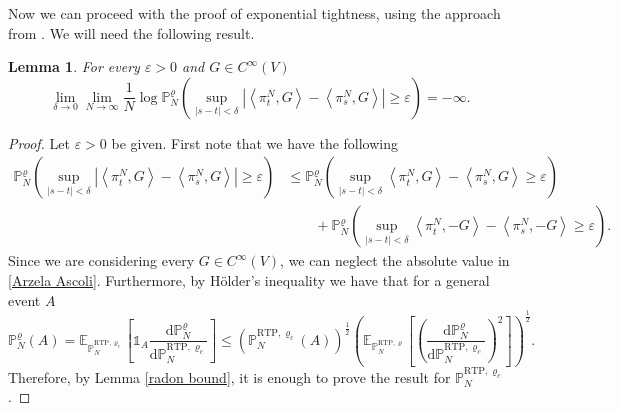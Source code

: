 \documentclass[11pt]{article}
\numberwithin{equation}{section}
\theoremstyle{definition}
\theoremstyle{plain}
\newtheorem{Lemma}[Theorem]{Lemma}
\newcommand{\E}{\mathbb{E}}
\newcommand{\p}{\mathbb{P}}
\newcommand{\dd}{\mathrm{d}}
\newcommand{\nn}{\nonumber}
\newcommand{\RTP}{\mathrm{RTP}}
\begin{document}
Now we can proceed with the proof of exponential tightness, using the approach from \cite{KipnisLandim}. We will need the following result.
    \begin{Lemma}\label{cont cond}
        For every $\varepsilon>0$ and $G \in C^\infty(V)$ 
            \begin{equation}\label{Arzela Ascoli}
                \lim_{\delta\to0} \lim_{N\to\infty} \frac{1}{N}\log \p^{\varrho}_N\left(\sup_{|s-t|<\delta} \left| \left<\pi^N_{t}, G\right> - \left<\pi^N_{s}, G\right> \right| \geq \varepsilon \right)= -\infty.
            \end{equation}
    \end{Lemma}
\begin{proof}
Let $\varepsilon>0$ be given. First note that we have the following 
    \begin{align}
        \p^{\varrho}_N\left(\sup_{|s-t|<\delta} \left| \left<\pi^N_{t}, G\right> - \left<\pi^N_{s}, G\right> \right| \geq \varepsilon \right)
        \nn&\leq \p^{\varrho}_N\left(\sup_{|s-t|<\delta}  \left<\pi^N_{t}, G\right> - \left<\pi^N_{s}, G\right>  \geq \varepsilon \right)\\
        &\qquad +\p^{\varrho}_N\left(\sup_{|s-t|<\delta}  \left<\pi^N_{t}, -G\right> - \left<\pi^N_{s}, -G\right>  \geq \varepsilon \right).
    \end{align}
Since we are considering every $G\in C^\infty(V)$, we can neglect the absolute value in \eqref{Arzela Ascoli}.
Furthermore, by H\"older's inequality we have that for a general event $A$
    \begin{equation}
        \p^{\varrho}_N(A) 
        = \E_{\p^{\RTP,\varrho_c}_N}\left[\mathds{1}_A \frac{\dd\p^{\varrho}_N}{\dd\p^{\RTP,\varrho_c}_N}\right] 
        \leq \left(\p^{\RTP,\varrho_c}_N(A)\right)^{\frac{1}{2}} \left(\E_{\p^{\RTP,\varrho}_N}\left[\left(\frac{\dd\p^{\varrho}_N}{\dd \p^{\RTP,\varrho_c}_N}\right)^2 \right]\right)^{\frac{1}{2}}.
    \end{equation}
Therefore, by Lemma \ref{radon bound}, it is enough to prove the result for $\p^{\RTP,\varrho_c}_N$.



\end{proof}
\end{document}
